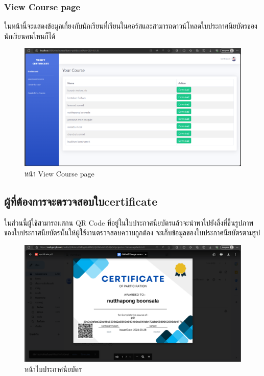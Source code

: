 \subsubsection{View Course page} 
\enskip \enskip \enskip \enskip \enskip
ในหน้านี้จะแสดงข้อมูลเกี่ยงกับนักเรียนที่เรียนในคอร์สและสามารถดาวน์โหลดใบประกาศนียบัตรของนักเรียนคนไหนก็ได้
\graphicspath{ {./images/} }
\begin{figure}[htbp]
  \centering 
  \includegraphics[scale=0.3]{view.png}
  \caption[หน้า View Course page]{หน้า View Course page}
  \label{fig:View Course page}
\end{figure}

\subsection{ผู้ที่ต้องการจะตรวจสอบใบcertificate}
\enskip \enskip \enskip \enskip \enskip
ในส่วนนี้ผู้ใช้สามารถแสกน QR Code ที่อยู่ในใบประกาศนียบัตรแล้วจะนำพาไปยังลิ้งที่ขึ้นรูปภาพของใบประกาศนียบัตรนั้นให้ผู้ใช้งานตรวจสอบความถูกต้อง จะเก็บข้อมูลของใบประกาศนียบัตรตามรูป
\graphicspath{ {./images/} }
\begin{figure}[htbp]
  \centering 
  \includegraphics[scale=0.3]{cer.png}
  \caption[หน้าใบประกาศนียบัตร]{หน้าใบประกาศนียบัตร}
  \label{fig:PPPPPPP}
\end{figure}